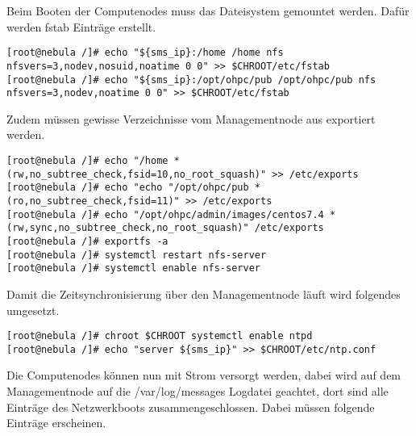 Beim Booten der Computenodes muss das Dateisystem gemountet werden. Dafür werden fstab Einträge erstellt. 

\begin{lstlisting}
[root@nebula /]# echo "${sms_ip}:/home /home nfs nfsvers=3,nodev,nosuid,noatime 0 0" >> $CHROOT/etc/fstab
[root@nebula /]# echo "${sms_ip}:/opt/ohpc/pub /opt/ohpc/pub nfs nfsvers=3,nodev,noatime 0 0" >> $CHROOT/etc/fstab
\end{lstlisting}

Zudem müssen gewisse Verzeichnisse vom Managementnode aus exportiert werden.

\begin{lstlisting}
[root@nebula /]# echo "/home *(rw,no_subtree_check,fsid=10,no_root_squash)" >> /etc/exports
[root@nebula /]# echo "echo "/opt/ohpc/pub *(ro,no_subtree_check,fsid=11)" >> /etc/exports
[root@nebula /]# echo "/opt/ohpc/admin/images/centos7.4 *(rw,sync,no_subtree_check,no_root_squash)" /etc/exports
[root@nebula /]# exportfs -a
[root@nebula /]# systemctl restart nfs-server
[root@nebula /]# systemctl enable nfs-server
\end{lstlisting}

Damit die Zeitsynchronisierung über den Managementnode läuft wird folgendes umgesetzt.

\begin{lstlisting}
[root@nebula /]# chroot $CHROOT systemctl enable ntpd
[root@nebula /]# echo "server ${sms_ip}" >> $CHROOT/etc/ntp.conf
\end{lstlisting}

Die Computenodes können nun mit Strom versorgt werden, dabei wird auf dem Managementnode auf die /var/log/messages Logdatei geachtet, dort sind alle Einträge des Netzwerkboots zusammengeschlossen. Dabei müssen folgende Einträge erscheinen.

